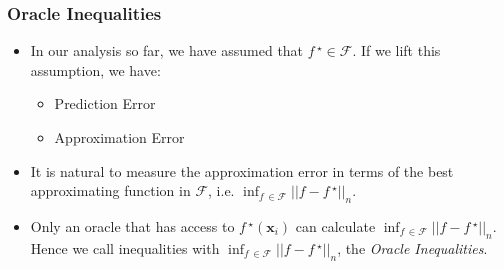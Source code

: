 \documentclass[11pt]{beamer}
\newcommand{\bx}{\mathbf{x}}
\newcommand{\cF}{\mathcal{F}}
\newcommand{\fstar}{f\,^\star}
\begin{document}
	\begin{frame}
		\frametitle{Oracle Inequalities}
		\begin{itemize}
			\item 		In our analysis so far, we have assumed that $\fstar \in \cF$. If we lift this assumption, we have:
			\begin{itemize}
				\item Prediction Error
				\item Approximation Error
			\end{itemize}
			\item It is natural to measure the approximation error in terms of the best approximating function in $\cF$, i.e. $\inf_{f\,\in \cF} || f - \fstar||_n$.
			\item Only an oracle that has access to $\fstar(\bx_i)$ can calculate $\inf_{f\,\in \cF} || f - \fstar||_n$. Hence we call inequalities with $\inf_{f\,\in \cF} || f - \fstar||_n$, the \textit{Oracle Inequalities}.
		\end{itemize}
	\end{frame}
\end{document}
